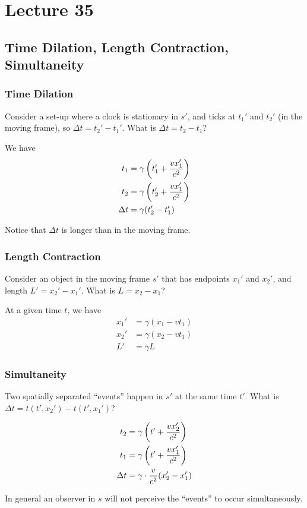 \documentclass[class=article, crop=false]{standalone}
\begin{document}
  \section{Lecture 35}
  \subsection{Time Dilation, Length Contraction, Simultaneity}
  \subsubsection{Time Dilation}
  Consider a set-up where a clock is stationary in $s'$, and ticks at $t_1'$ and $t_2'$ (in the moving frame), so $\Delta t = t_2' - t_1'$. What is $\Delta t = t_2 - t_1$? \par
  We have
  \begin{align*}
    t_1 &= \gamma \left( t_1' + \frac{vx_1'}{c^2} \right) \\
    t_2 &= \gamma \left( t_2' + \frac{vx_1'}{c^2} \right) \\
    \Delta t &= \gamma(t_2' - t_1')
  \end{align*}
  \begin{note}{}
    Notice that $\Delta t$ is longer than in the moving frame.
  \end{note}
  \subsubsection{Length Contraction}
  Consider an object in the moving frame $s'$ that has endpoints $x_1'$ and $x_2'$, and length $L' = x_2' - x_1'$. What is $L = x_2 - x_1$? \par
  At a given time $t$, we have
  \begin{align*}
    x_1' &= \gamma(x_1 - vt_1) \\
    x_2' &= \gamma(x_2 - vt_1) \\
    L' &= \gamma L
  \end{align*}
  \subsubsection{Simultaneity}
  Two spatially separated ``events'' happen in $s'$ at the same time $t'$. What is $\Delta t = t(t', x_2') - t(t',x_1')$? \par
  \begin{align*}
    t_2 &= \gamma\left( t' + \frac{vx_2'}{c^2} \right) \\
    t_1 &= \gamma\left( t' + \frac{vx_1'}{c^2} \right) \\
    \Delta t &= \gamma\cdot \frac{v}{c^2}(x_2' - x_1')
  \end{align*}
  \begin{note}{}
    In general an observer in $s$ will not perceive the ``events'' to occur simultaneously.
  \end{note}
\end{document}
